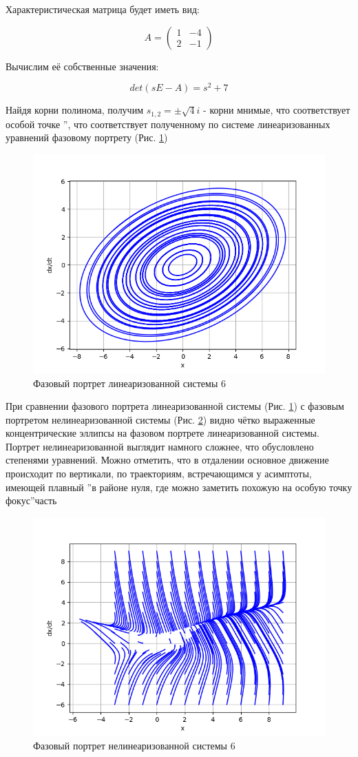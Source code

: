 Характеристическая матрица будет иметь вид:

$$
A = 
\begin{pmatrix}
	1 & -4 \\
	2 & -1
\end{pmatrix}
$$

Вычислим её собственные значения:

$$
det(sE - A) = s^2 + 7
$$

Найдя корни полинома, получим $s_{1,2} = \pm \sqrt{4}i$ - корни мнимые, 
что соответствует особой точке \textquotedblright, 
что соответствует полученному по системе линеаризованных уравнений фазовому портрету (Рис. \ref{fig:11})

\begin{figure}[H]
	\centering
	\includegraphics[width=0.6\linewidth]{body/images/Linearized-system-6.png}
	\caption{Фазовый портрет линеаризованной системы 6}
	\label{fig:11}
\end{figure}

При сравнении фазового портрета линеаризованной системы (Рис. \ref{fig:11}) с фазовым портретом нелинеаризованной системы
(Рис. \ref{fig:12}) видно чётко выраженные концентрические эллипсы на фазовом портрете линеаризованной системы.
Портрет нелинеаризованной выглядит намного сложнее, что обусловлено степенями уравнений. Можно отметить, что в отдалении 
основное движение происходит по вертикали, по траекториям, встречающимся у асимптоты, имеющей плавный \textquotedblright в районе нуля, 
где можно заметить похожую на особую точку  фокус\textquotedblright часть

\begin{figure}[H]
	\centering
	\includegraphics[width=0.6\linewidth]{body/images/System-6.png}
	\caption{Фазовый портрет нелинеаризованной системы 6}
	\label{fig:12}
\end{figure}


